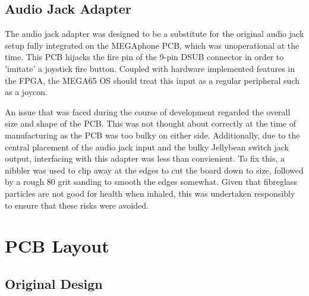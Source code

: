 \subsection{Audio Jack Adapter}

The audio jack adapter was designed to be a substitute for the original audio jack setup fully integrated on the MEGAphone PCB, which was unoperational at the time.
This PCB hijacks the fire pin of the 9-pin DSUB connector in order to 'imitate' a joystick fire button. 
Coupled with hardware implemented features in the FPGA, the MEGA65 OS should treat this input as a regular peripheral such as a joycon.

An issue that was faced during the course of development regarded the overall size and shape of the PCB.
This was not thought about correctly at the time of manufacturing as the PCB was too bulky on either side.
Additionally, due to the central placement of the audio jack input and the bulky Jellybean switch jack output, interfacing with this adapter was less than convienient.
To fix this, a nibbler was used to clip away at the edges to cut the board down to size, followed by a rough 80 grit sanding to smooth the edges somewhat.
Given that fibreglass particles are not good for health when inhaled, this was undertaken responsibly to ensure that these risks were avoided.



\section{PCB Layout}  %


\subsection{Original Design}

